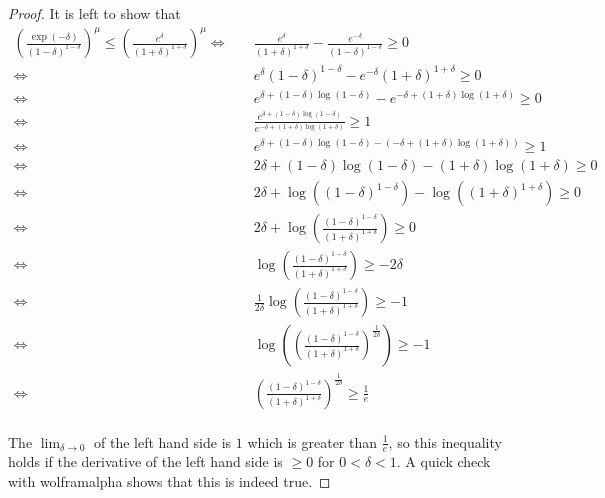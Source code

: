 \documentclass[10pt,a4paper]{article}
\begin{document}
\begin{proof}
  It is left to show that
  \begin{align*}
    \left( \frac{\exp\left( -\delta \right)}{(1 - \delta)^{1 - \delta}} \right)^{\mu} \le \left( \frac{e^{\delta}}{(1 + \delta)^{1 + \delta}} \right)^{\mu} \Leftrightarrow &\quad \frac{e^{\delta}}{(1 + \delta)^{1 + \delta}} - \frac{e^{-\delta}}{(1 - \delta)^{1 - \delta}} \ge 0\\
    \Leftrightarrow &\quad e^{\delta}(1 - \delta)^{1 - \delta} - e^{-\delta}(1 + \delta)^{1 + \delta} \ge 0\\
    \Leftrightarrow &\quad e^{\delta + (1 - \delta)\log(1 - \delta)} - e^{-\delta + (1 + \delta)\log(1 + \delta)} \ge 0\\
    \Leftrightarrow &\quad \frac{e^{\delta + (1 - \delta)\log(1 - \delta)}}{e^{-\delta + (1 + \delta)\log(1 + \delta)}} \ge 1\\
    \Leftrightarrow &\quad e^{\delta + (1 - \delta)\log(1 - \delta) - (-\delta + (1 + \delta)\log(1 + \delta))} \ge 1\\
    \Leftrightarrow &\quad 2\delta + (1 - \delta)\log(1 - \delta) - (1 + \delta)\log(1 + \delta) \ge 0\\
    \Leftrightarrow &\quad 2\delta + \log\left( \left( 1 - \delta \right)^{1 - \delta} \right) - \log\left( \left( 1 + \delta \right)^{1 + \delta} \right) \ge 0\\
    \Leftrightarrow &\quad 2\delta + \log\left( \frac{\left( 1 - \delta \right)^{1 - \delta}}{\left( 1 + \delta \right)^{1 + \delta}} \right) \ge 0\\
    \Leftrightarrow &\quad \log\left( \frac{\left( 1 - \delta \right)^{1 - \delta}}{\left( 1 + \delta \right)^{1 + \delta}} \right) \ge -2\delta\\
    \Leftrightarrow &\quad \frac{1}{2\delta}\log\left( \frac{\left( 1 - \delta \right)^{1 - \delta}}{\left( 1 + \delta \right)^{1 + \delta}} \right) \ge -1\\
    \Leftrightarrow &\quad \log\left( \left(\frac{\left( 1 - \delta \right)^{1 - \delta}}{\left( 1 + \delta \right)^{1 + \delta}}\right)^{\frac{1}{2\delta}} \right) \ge -1\\
    \Leftrightarrow &\quad \left(\frac{\left( 1 - \delta \right)^{1 - \delta}}{\left( 1 + \delta \right)^{1 + \delta}}\right)^{\frac{1}{2\delta}} \ge \frac{1}{e}\\
  \end{align*}

  The $\lim_{\delta \rightarrow 0}$ of the left hand side is $1$ which is greater than $\frac{1}{e}$, so this inequality holds if the derivative of the left hand side is $\ge 0$ for $0 < \delta < 1$.
  A quick check with wolframalpha shows that this is indeed true.


\end{proof}
\end{document}
